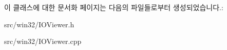 이 클래스에 대한 문서화 페이지는 다음의 파일들로부터 생성되었습니다.\+:\begin{DoxyCompactItemize}
\item 
src/win32/I\+O\+Viewer.\+h\item 
src/win32/I\+O\+Viewer.\+cpp\end{DoxyCompactItemize}
